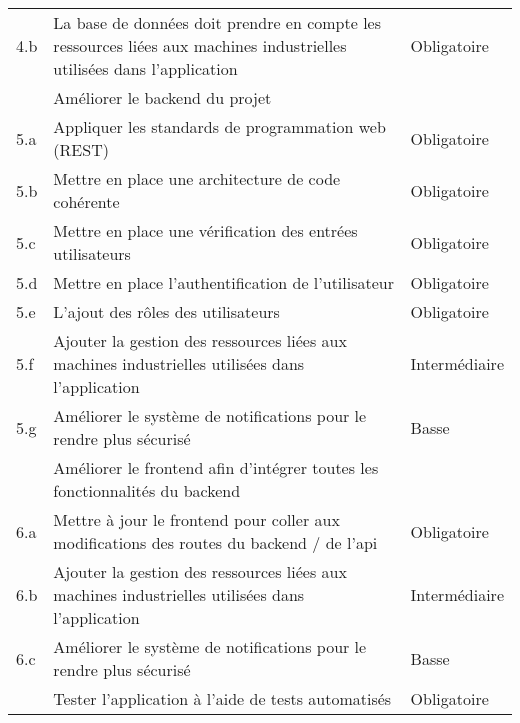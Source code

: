 \documentclass[
    iai, %
    il, %
]{heig-tb}
\begin{document}
\begin{table}[h]
\begin{center}
\begin{tabularx}{0.8\textwidth} {
                | >{\centering\arraybackslash}X
                | >{\centering\arraybackslash}X
                | >{\centering\arraybackslash}X |}
            4.b & La base de données doit prendre en compte les ressources liées aux machines industrielles utilisées dans l'application & Obligatoire   \\
            5   & Améliorer le backend du projet                                                                                         &               \\
            5.a & Appliquer les standards de programmation web (REST)                                                                    & Obligatoire   \\
            5.b & Mettre en place une architecture de code cohérente                                                                     & Obligatoire   \\
            5.c & Mettre en place une vérification des entrées utilisateurs                                                              & Obligatoire   \\
            5.d & Mettre en place l'authentification de l'utilisateur                                                                    & Obligatoire   \\
            5.e & L'ajout des rôles des utilisateurs                                                                                     & Obligatoire   \\
            5.f & Ajouter la gestion des ressources liées aux machines industrielles utilisées dans l'application                        & Intermédiaire \\
            5.g & Améliorer le système de notifications pour le rendre plus sécurisé                                                     & Basse         \\
            6   & Améliorer le frontend afin d'intégrer toutes les fonctionnalités du backend                                            &               \\
            6.a & Mettre à jour le frontend pour coller aux modifications des routes du backend / de l'api                               & Obligatoire   \\
            6.b & Ajouter la gestion des ressources liées aux machines industrielles utilisées dans l'application                        & Intermédiaire \\
            6.c & Améliorer le système de notifications pour le rendre plus sécurisé                                                     & Basse         \\
            7   & Tester l'application à l'aide de tests automatisés                                                                     & Obligatoire   \\

\end{tabularx}
\end{center}
\end{table}
\end{document}
